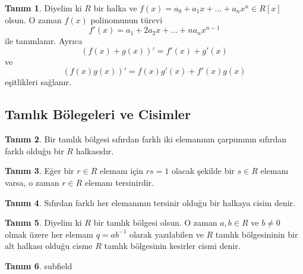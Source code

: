 \documentclass[draft]{article}
\theoremstyle{definition}
\newtheorem{defn}{Tanım}[section]
\theoremstyle{remark}
\begin{document}
    		\begin{defn}
    		    Diyelim ki $R$ bir halka ve $f(x) = a_0 + a_1x + \dots + a_nx^n \in R[x]$ olsun. O zaman $f(x)$ polinomunun türevi
    		    \begin{equation*}
    		        f'(x) = a_1 + 2a_2x+ \dots + na_nx^{n - 1}
    		    \end{equation*}
    		    ile tanımlanır. Ayrıca
    		    \begin{equation*}
    		        (f(x) + g(x))' = f'(x) + g'(x)
    		    \end{equation*}
    		    ve
    		    \begin{equation*}
    		        (f(x)g(x))' = f(x)g'(x) + f'(x)g(x)
    		    \end{equation*}
    		    eşitlikleri sağlanır.
    		\end{defn}
		
		\subsection{Tamlık Bölegeleri ve Cisimler}
		
    		\begin{defn}
    		    Bir tamlık bölgesi sıfırdan farklı iki elemanının çarpımının sıfırdan farklı olduğu bir $R$ halkasıdır.
    		\end{defn}
    		
    		\begin{defn}
    		    Eğer bir $r \in R$ elemanı için $rs = 1$ olacak şekilde bir $s \in R$ elemanı varsa, o zaman $r \in R$ elemanı tersinirdir.
    		\end{defn}
        	    
            \begin{defn}
                Sıfırdan farklı her elemanının tersinir olduğu bir halkaya cisim denir.
        	\end{defn}
        		
        	\begin{defn}
        	    Diyelim ki $R$ bir tamlık bölgesi olsun. O zaman $a, b \in R$ ve $b \neq 0$ olmak üzere her elemanı $q = ab^{-1}$ olarak yazılabilen ve $R$ tamlık bölgesininin bir alt halkası olduğu cisme $R$ tamlık bölgesinin kesirler cismi denir.
        	\end{defn}
        	
        	\begin{defn}
        	    subfield
        	\end{defn}
        	
\end{document}

